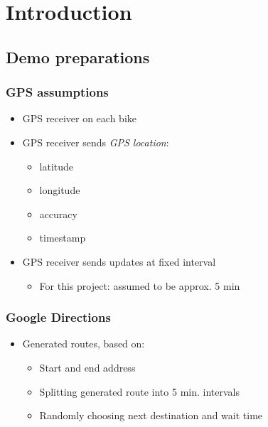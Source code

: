 \section{Introduction}

\subsection{Demo preparations}

\begin{frame}
\frametitle{GPS assumptions}

\begin{itemize}
\item GPS receiver on each bike
\item GPS receiver sends \textit{GPS location}:
  \begin{itemize}
  \item latitude
  \item longitude
  \item accuracy
  \item timestamp
  \end{itemize}
\item GPS receiver sends updates at fixed interval
  \begin{itemize}
  \item For this project: assumed to be approx. 5 min
  \end{itemize}
\end{itemize}

\end{frame}

\begin{frame}
\frametitle{Google Directions}

\begin{itemize}
\item Generated routes, based on:
  \begin{itemize}
  \item Start and end address
  \item Splitting generated route into 5 min. intervals
  \item Randomly choosing next destination and wait time
  \end{itemize}
\end{itemize}

\end{frame}
